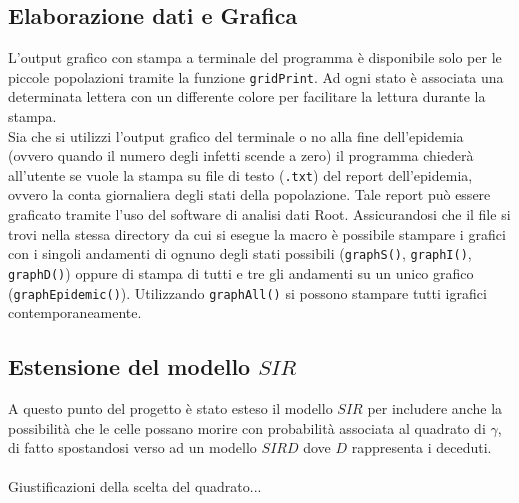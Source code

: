 \documentclass[a4paper]{article}
\begin{document}
\subsection{Elaborazione dati e Grafica}
L'output grafico con stampa a terminale del programma è disponibile solo per le piccole popolazioni tramite la funzione \texttt{gridPrint}. Ad ogni stato è associata una determinata lettera con un differente colore per facilitare la lettura durante la stampa. \\
Sia che si utilizzi l'output grafico del terminale o no alla fine dell'epidemia (ovvero quando il numero degli infetti scende a zero) il programma chiederà all'utente se vuole la stampa su file di testo (\texttt{.txt}) del report dell'epidemia, ovvero la conta giornaliera degli stati della popolazione. Tale report può essere graficato tramite l'uso del software di analisi dati Root. Assicurandosi che il file si trovi nella stessa directory da cui si esegue la macro è possibile stampare i grafici con i singoli andamenti di ognuno degli stati possibili (\texttt{graphS()}, \texttt{graphI()}, \texttt{graphD()}) oppure di stampa di tutti e tre gli andamenti su un unico grafico (\texttt{graphEpidemic()}). Utilizzando \texttt{graphAll()} si possono stampare tutti igrafici contemporaneamente.
\subsection{Estensione del modello $SIR$}
A questo punto del progetto è stato esteso il modello $SIR$ per includere anche la possibilità che le celle possano morire con probabilità associata al quadrato di $\gamma$, di fatto spostandosi verso ad un modello $SIRD$ dove $D$ rappresenta i deceduti.\\ \\
Giustificazioni della scelta del quadrato...\\ \\
\end{document}
